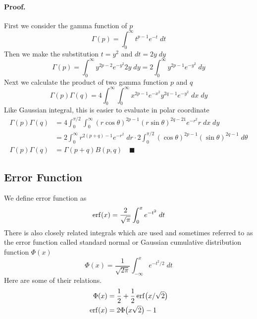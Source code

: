 \documentclass[../../main.tex]{subfiles}
\begin{document}
\paragraph{Proof.} First we consider the gamma function of $p$
\begin{equation*}
    \Gamma(p)=\int_{0}^{\infty}t^{p-1}e^{-t}\;dt
\end{equation*}
Then we make the substitution $t=y^2$ and $dt=2y\;dy$
\begin{equation*}
    \Gamma(p)=\int_{0}^{\infty}y^{2p-2}e^{-y^2}2y\;dy=2\int_{0}^{\infty}y^{2p-1}e^{-y^2}\;dy
\end{equation*}
Next we calculate the product of two gamma function $p$ and $q$
\begin{equation*}
    \Gamma(p)\Gamma(q)=4\int_{0}^{\infty}\int_{0}^{\infty} x^{2p-1}e^{-x^2} y^{2q-1}e^{-y^2}\;dx\;dy
\end{equation*}
Like Gaussian integral, this is easier to evaluate in polar coordinate
\begin{align*}
    \Gamma(p)\Gamma(q)&=4\int_{0}^{\pi/2}\int_{0}^{\infty} (r\cos\theta)^{2p-1} (r\sin\theta)^{2q-21}e^{-r^2}r\;dx\;dy\\
    &=2\int_{0}^{\infty}r^{2(p+q)-1}e^{-r^2}\;dr\cdot 2\int_{0}^{\pi/2} (\cos\theta)^{2p-1}(\sin\theta)^{2q-1}\;d\theta\\
    \Gamma(p)\Gamma(q)&=\Gamma(p+q)B(p,q)\quad\blacksquare
\end{align*}

\subsection*{Error Function} We define error function as 
\begin{equation*}
    \operatorname{erf}(x)=\frac{2}{\sqrt{\pi}}\int_{0}^{x}e^{-t^2}\;dt
\end{equation*}
There is also closely related integrals which are used and sometimes referred to as the error function called standard normal or Gaussian cumulative distribution function $\Phi(x)$
\begin{equation*}
    \Phi(x)=\frac{1}{\sqrt{2\pi}}\int_{-\infty}^{x} e^{-t^2/2}\;dt
\end{equation*}
Here are some of their relations.
\begin{align*}
    \Phi(x)&=\frac{1}{2}+\frac{1}{2}\operatorname{erf}\bigl(x/\sqrt{2}\bigr)\\
    \operatorname{erf}(x)&=2\Phi\bigl(x\sqrt{2}\bigr)-1
\end{align*}
\end{document}
